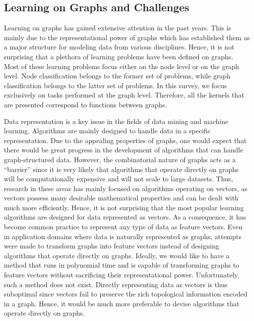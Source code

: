\documentclass[twoside,11pt]{article}
\begin{document}
\subsection{Learning on Graphs and Challenges}
Learning on graphs has gained extensive attention in the past years.
This is mainly due to the representational power of graphs which has established them as a major structure for modeling data from various disciplines.
Hence, it is not surprising that a plethora of learning problems have been defined on graphs. 
Most of these learning problems focus either on the node level or on the graph level.
Node classification belongs to the former set of problems, while graph classification belongs to the latter set of problems.
In this survey, we focus exclusively on tasks performed at the graph level.
Therefore, all the kernels that are presented correspond to functions between graphs.

Data representation is a key issue in the fields of data mining and machine learning.
Algorithms are mainly designed to handle data in a specific representation.
Due to the appealing properties of graphs, one would expect that there would be great progress in the development of algorithms that can handle graph-structured data.
However, the combinatorial nature of graphs acts as a ``barrier'' since it is very likely that algorithms that operate directly on graphs will be computationally expensive and will not scale to large datasets.
Thus, research in these areas has mainly focused on algorithms operating on vectors, as vectors possess many desirable mathematical properties and can be dealt with much more efficiently.
Hence, it is not surprising that the most popular learning algorithms are designed for data represented as vectors.
As a consequence, it has become common practice to represent any type of data as feature vectors.
Even in application domains where data is naturally represented as graphs, attempts were made to transform graphs into feature vectors instead of designing algorithms that operate directly on graphs.
Ideally, we would like to have a method that runs in polynomial time and is capable of transforming graphs to feature vectors without sacrificing their representational power.
Unfortunately, such a method does not exist.
Directly representing data as vectors is thus suboptimal since vectors fail to preserve the rich topological information encoded in a graph.
Hence, it would be much more preferable to devise algorithms that operate directly on graphs.
\end{document}
